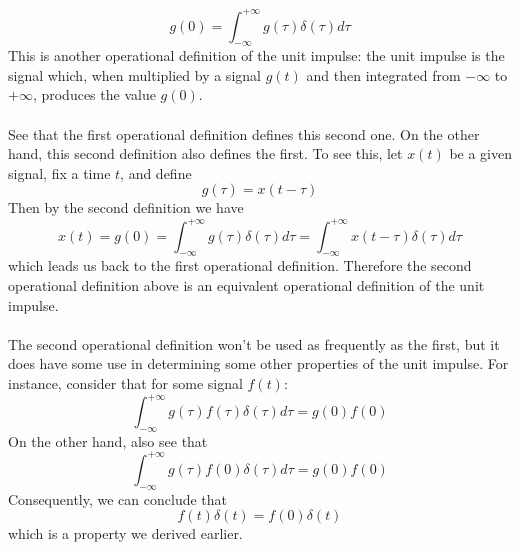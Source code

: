 \documentclass{report}
\begin{document}
\begin{equation*}
g(0)=\int^{+\infty}_{-\infty}g(\tau)\delta(\tau)d\tau
\end{equation*}
This is another operational definition of the unit impulse: the unit impulse is the signal which, when multiplied by a signal $g(t)$ and then integrated from $-\infty$ to $+\infty$, produces
the value $g(0)$.\\
\vspace{1mm}\\
See that the first operational definition defines this second one. On the other hand, this second definition also defines the first. To see this, let $x(t)$ be a given signal, fix a time $t$, and define
\begin{equation*}
g(\tau)=x(t-\tau)
\end{equation*}
Then by the second definition we have
\begin{equation*}
x(t)=g(0)=\int^{+\infty}_{-\infty}g(\tau)\delta(\tau)d\tau
=\int^{+\infty}_{-\infty}x(t-\tau)\delta(\tau)d\tau
\end{equation*}
which leads us back to the first operational definition. Therefore the second operational definition above is an equivalent operational definition of the unit impulse.\\
\vspace{1mm}\\
The second operational definition won't be used as frequently as the first, but it does have some use in determining some other properties of the unit impulse. For instance, consider that for some signal
$f(t)$:
\begin{equation*}
\int^{+\infty}_{-\infty}g(\tau)f(\tau)\delta(\tau)d\tau=g(0)f(0)
\end{equation*}
On the other hand, also see that
\begin{equation*}
\int^{+\infty}_{-\infty}g(\tau)f(0)\delta(\tau)d\tau=g(0)f(0)
\end{equation*}
Consequently, we can conclude that
\begin{equation*}
f(t)\delta(t)=f(0)\delta(t)
\end{equation*}
which is a property we derived earlier.
\newpage
\end{document}
